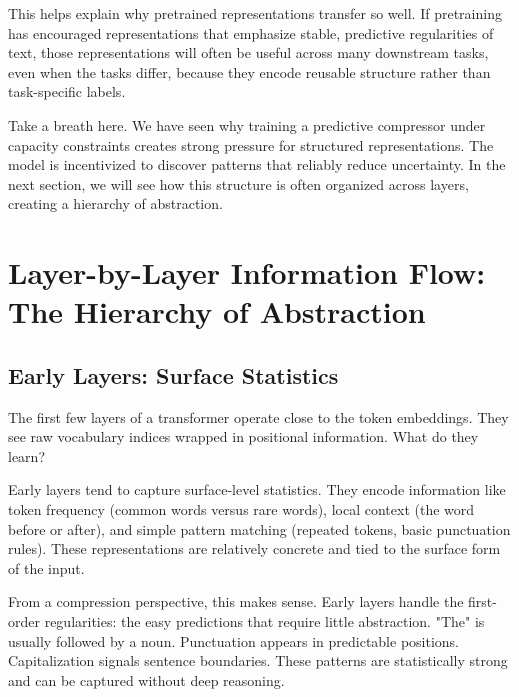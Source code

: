 \vspace{1em}

This helps explain why pretrained representations transfer so well. If pretraining has encouraged representations that emphasize stable, predictive regularities of text, those representations will often be useful across many downstream tasks, even when the tasks differ, because they encode reusable structure rather than task-specific labels.

\vspace{2em}

Take a breath here. We have seen why training a predictive compressor under capacity constraints creates strong pressure for structured representations. The model is incentivized to discover patterns that reliably reduce uncertainty. In the next section, we will see how this structure is often organized across layers, creating a hierarchy of abstraction.

\vspace{2em}

\section{Layer-by-Layer Information Flow: The Hierarchy of Abstraction}
\label{sec:layer_hierarchy}

\vspace{1em}

\subsection{Early Layers: Surface Statistics}

The first few layers of a transformer operate close to the token embeddings. They see raw vocabulary indices wrapped in positional information. What do they learn?

Early layers tend to capture surface-level statistics. They encode information like token frequency (common words versus rare words), local context (the word before or after), and simple pattern matching (repeated tokens, basic punctuation rules). These representations are relatively concrete and tied to the surface form of the input.

From a compression perspective, this makes sense. Early layers handle the first-order regularities: the easy predictions that require little abstraction. "The" is usually followed by a noun. Punctuation appears in predictable positions. Capitalization signals sentence boundaries. These patterns are statistically strong and can be captured without deep reasoning.

